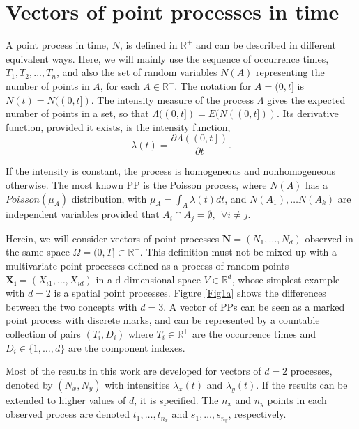 \section{Vectors of point processes in time} 

\label{VectorPP}

A point process in time, $N$, is defined  in $\mathbb{R}^+$ and  can be described  in  different   equivalent ways. Here, we will mainly use  the sequence of  occurrence times, $T_1, T_2, ..., T_n$,  and also  the set of random variables $N(A)$ representing the number of points in $A$, for each $A \in  \mathbb{R}^+$.  The notation for $A=(0, t]$  is $N(t)=N((0,t])$.  
The intensity measure of the process $\Lambda$ gives the expected number of points in  a set,  so that $\Lambda((0,t])=E(N((0,t]))$.
Its derivative function, provided it exists, is  the intensity function,
$$
\lambda\left(t\right)=\frac{\partial \Lambda\left(\left(0, t\right]\right)}{\partial t}.
$$



If the intensity is constant,  the process is homogeneous and  nonhomogeneous  otherwise. The most known PP is the Poisson process,  where  $N(A)$  has a $Poisson(\mu_A)$ distribution, with $\mu_A=\int_A \lambda(t) dt$, and $N(A_1), \ldots N(A_k)$ are independent variables provided that $A_i \cap A_j= \emptyset ,\ \  \forall i \ne j$.


Herein,   we will consider vectors of point processes  $\mathbf{N}=(N_1, \ldots, N_d)$	observed in  the same  space $\Omega=(0, T] \subset \mathbb{R}^+$. This definition  must not be  mixed up with	a multivariate point processes  defined as a process of random points $\mathbf{X_i}=(X_{i1},\ldots, X_{id})$   in a d-dimensional space $V\in \mathbb{R}^d$,
whose simplest example with $d=2$ is a spatial point  processes.  Figure \ref{Fig1a}  shows  the differences between the two concepts with $d=3$. 
 A vector of PPs can be seen as a  marked point process with discrete marks, and   can be represented by a countable collection of pairs  $(T_i, D_i)$ where  $T_i \in \mathbb{R}^+$ are the  occurrence times and $D_i \in \{1, \ldots , d\}$ are the component indexes.


Most of the results  in this work are developed  for  vectors of $d=2$ processes,  denoted by $(N_x, N_y)$ with intensities $\lambda_x(t)$ and $\lambda_y(t)$. If the results  can be extended to  higher values of $d$, it is specified. The  $n_x$ and $n_y$  points in  each observed  process are denoted	$t_{1}, \ldots, t_{n_x}$ and  $s_{1}, \ldots, s_{n_y}$,  respectively.



